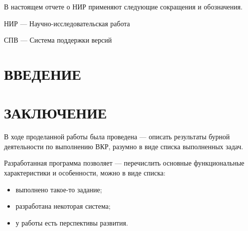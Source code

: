 \documentclass[a4paper,12pt]{article}
\begin{document}
В настоящем отчете о НИР применяют следующие сокращения и обозначения.

НИР --- Научно-исследовательская работа

СПВ --- Система поддержки версий

\pagebreak

\section*{\centering ВВЕДЕНИЕ}
\pagebreak

%
\pagebreak
\pagebreak
\pagebreak




\section*{\centering ЗАКЛЮЧЕНИЕ}

В ходе проделанной работы была проведена --- описать результаты бурной деятельности по выполнению ВКР, разумно в виде списка выполненных задач.

Разработанная программа позволяет --- перечислить основные функциональные характеристики и особенности, можно в виде списка:
\begin{itemize}
\item выполнено такое-то задание;
\item разработана некоторая система;
\item у работы есть перспективы развития.
\end{itemize}

\pagebreak

\printbibliography
\end{document}
